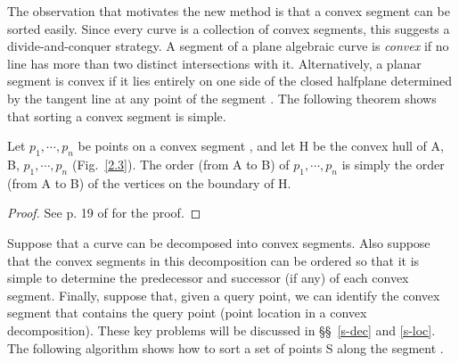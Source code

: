 The observation that motivates the new method is that 
a convex segment can be sorted easily.
Since every curve is a collection of convex segments,
this suggests a divide-and-conquer strategy.
A segment of a plane algebraic curve is {\em convex} if no line has more than 
two distinct intersections with it.
Alternatively, a planar segment is convex if it lies entirely on one side of
the closed halfplane determined by the tangent line at any point of
the segment \cite{Do}.
The following theorem shows that sorting a convex segment is simple.

\begin{theorem}
\label{T-s}
Let $p_{1},\cdots,p_{n}$ be points on a convex segment , 
and let H be the convex hull of A, B, $p_{1},\cdots,p_{n}$ {\rm (}Fig.~{\rm \ref{2.3})}.
The order {\rm (}from A to B{\rm )} of $p_{1},\cdots,p_{n}$ is simply 
the order {\rm (}from A to B{\rm )} of the vertices on the boundary of H.
\end{theorem}

\begin{proof}
See p. 19 of \cite{jj} for the proof.
\end{proof}

\vspace{.2in}


Suppose that a curve can be decomposed into convex segments.
Also suppose that the convex segments in this decomposition can be ordered
so that it is simple to determine the predecessor and successor (if any) of each
convex segment.
Finally, suppose that, given a query point, 
we can identify the convex segment 
that contains the query point (point location in a convex decomposition).
These key problems will be discussed in 
\S\S~\ref{s-dec} and \ref{s-loc}.
The following algorithm shows how to sort a set of points S 
along the segment .

\vspace{.2in}

